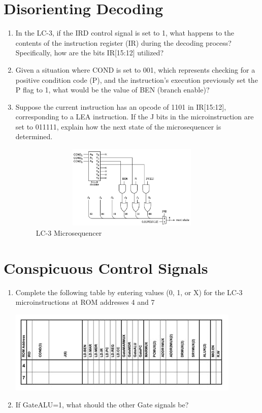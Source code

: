 \documentclass{article}
\begin{document}
    \section{Disorienting Decoding}
    \begin{enumerate}[label=(\alph*), itemsep = 120pt]
        \item In the LC-3, if the IRD control signal is set to 1, what happens to the contents of the instruction register (IR) during the decoding process? Specifically, how are the bits IR[15:12] utilized?
        \item Given a situation where COND is set to 001, which represents checking for a positive condition code (P), and the instruction’s execution previously set the P flag to 1, what would be the value of BEN (branch enable)?
        \item Suppose the current instruction has an opcode of 1101 in IR[15:12], corresponding to a LEA instruction. If the J bits in the microinstruction are set to 011111, explain how the next state of the microsequencer is determined.
        \vspace{4cm}
        \begin{figure}[ht]
            \centering
            \includegraphics[width=10cm,height=4cm]{figures/microsequencer.png}
            \caption{LC-3 Microsequencer}
            \label{fig:optionalLabel}
            \end{figure}
        \newpage
    \end{enumerate}
    
    \section{Conspicuous Control Signals}
    \begin{enumerate}[label=(\alph*),itemsep = 120pt]
        \item Complete the following table by entering values (0, 1, or X) for the LC-3 microinstructions at ROM addresses 4 and 7
        
        \includegraphics{figures/ControlSignals.jpg}
        \item If GateALU=1, what should the other Gate signals be?
        \newpage
    \end{enumerate}
    
\end{document}
